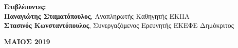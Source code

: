 \begin{titlepage}
\begin{center}
		\vspace{1.5cm}
		\textbf{Επιβλέποντες:}\\
		\textbf{Παναγιώτης Σταματόπουλος}, Αναπληρωτής Καθηγητής ΕΚΠΑ\\
		\textbf{Στασινός Κωνσταντόπουλος}, Συνεργαζόμενος Ερευνητής ΕΚΕΦΕ Δημόκριτος
		
		\vfill
		
		\vspace{0.8cm}
		\textbf{ΜΑΪΟΣ 2019}
		\thispagestyle{empty}
	\end{center}
\end{titlepage}